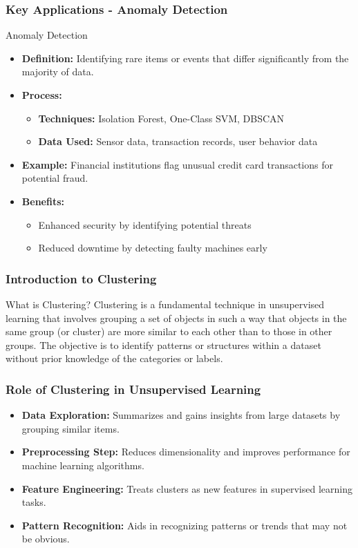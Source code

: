 \documentclass{beamer}
\begin{document}
\begin{frame}[fragile]
    \frametitle{Key Applications - Anomaly Detection}
    \begin{block}{Anomaly Detection}
        \begin{itemize}
            \item \textbf{Definition:} Identifying rare items or events that differ significantly from the majority of data.
            \item \textbf{Process:}
            \begin{itemize}
                \item \textbf{Techniques:} Isolation Forest, One-Class SVM, DBSCAN
                \item \textbf{Data Used:} Sensor data, transaction records, user behavior data
            \end{itemize}
            \item \textbf{Example:} Financial institutions flag unusual credit card transactions for potential fraud.
            \item \textbf{Benefits:}
            \begin{itemize}
                \item Enhanced security by identifying potential threats
                \item Reduced downtime by detecting faulty machines early
            \end{itemize}
        \end{itemize}
    \end{block}
\end{frame}

\begin{frame}[fragile]
    \frametitle{Introduction to Clustering}
    \begin{block}{What is Clustering?}
        Clustering is a fundamental technique in unsupervised learning that involves grouping a set of objects in such a way that objects in the same group (or cluster) are more similar to each other than to those in other groups. 
        The objective is to identify patterns or structures within a dataset without prior knowledge of the categories or labels.
    \end{block}
\end{frame}

\begin{frame}[fragile]
    \frametitle{Role of Clustering in Unsupervised Learning}
    \begin{itemize}
        \item \textbf{Data Exploration:} Summarizes and gains insights from large datasets by grouping similar items.
        \item \textbf{Preprocessing Step:} Reduces dimensionality and improves performance for machine learning algorithms.
        \item \textbf{Feature Engineering:} Treats clusters as new features in supervised learning tasks.
        \item \textbf{Pattern Recognition:} Aids in recognizing patterns or trends that may not be obvious.
    \end{itemize}
\end{frame}
\end{document}
